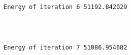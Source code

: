 \documentclass[11pt]{article}
\begin{document}
    \begin{center}
    \end{center}
    { \hspace*{\fill} \\}
    
    \begin{Verbatim}[commandchars=\\\{\}]
Energy of iteration 6 51192.842029 


    \end{Verbatim}

    \begin{center}
    \end{center}
    { \hspace*{\fill} \\}
    
    \begin{Verbatim}[commandchars=\\\{\}]
Energy of iteration 7 51086.954682 


    \end{Verbatim}


    
    
    
    
\end{document}
